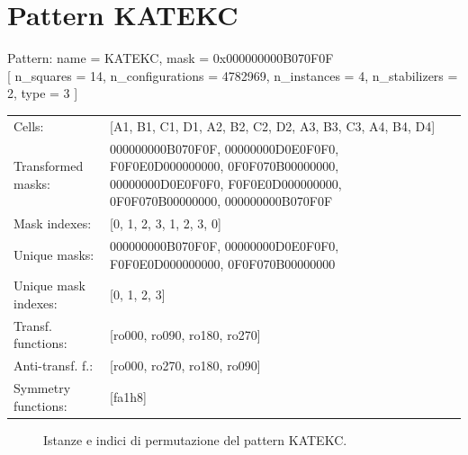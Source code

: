 \newpage

\section{Pattern KATEKC}

\begin{tcolorbox}[sharp corners, fontupper=\ttfamily\small, colback=white]
  \noindent Pattern: name = KATEKC, mask = 0x000000000B070F0F\\
  {[} n\_squares = 14, n\_configurations = 4782969,
  n\_instances = 4, n\_stabilizers = 2, type = 3 { ]}\\[1.0ex]
  \begin{tabularx}{\textwidth}{@{} p{3.5cm} X @{}}
    Cells:               & {[}A1, B1, C1, D1, A2, B2, C2, D2, A3, B3, C3, A4, B4, D4{]}\\[0.5ex]
    Transformed masks:   & 000000000B070F0F, 00000000D0E0F0F0, F0F0E0D000000000, 0F0F070B00000000, 00000000D0E0F0F0, F0F0E0D000000000, 0F0F070B00000000, 000000000B070F0F\\[0.5ex]
    Mask indexes:        & {[}0, 1, 2, 3, 1, 2, 3, 0{]}\\[0.5ex]
    Unique masks:        & 000000000B070F0F, 00000000D0E0F0F0, F0F0E0D000000000, 0F0F070B00000000\\[0.5ex]
    Unique mask indexes: & {[}0, 1, 2, 3{]}\\[0.5ex]
    Transf. functions:   & {[}ro000, ro090, ro180, ro270{]}\\[0.5ex]
    Anti-transf. f.:     & {[}ro000, ro270, ro180, ro090{]}\\[0.5ex]
    Symmetry functions:  & {[}fa1h8{]}\\[0.5ex]
  \end{tabularx}
\end{tcolorbox}

\begin{figure}[htbp]
  \centering
   \hfill
   \hfill
   \hfill
  \vspace{0.3cm}
   \hfill
   \hfill
   \hfill
  \caption{Istanze e indici di permutazione del pattern KATEKC.}
\end{figure}

